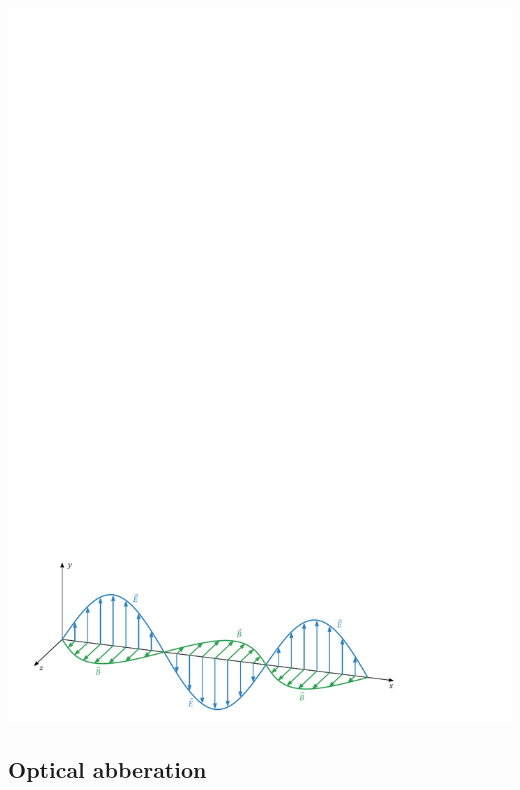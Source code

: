 \documentclass[11pt,a4paper]{article}
\begin{document}
\begin{center}
\includegraphics[scale=1]{pdf/examples/elmag_wave_1.pdf}
\end{center}

\subsection{Optical abberation}
\end{document}
